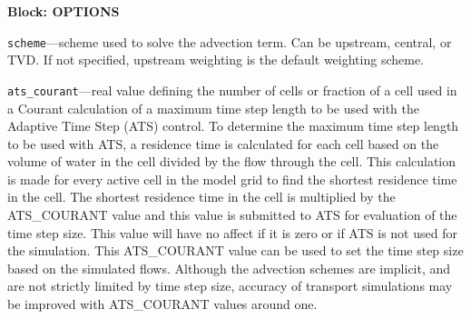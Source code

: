 
\item \textbf{Block: OPTIONS}

\begin{description}
\item \texttt{scheme}---scheme used to solve the advection term.  Can be upstream, central, or TVD.  If not specified, upstream weighting is the default weighting scheme.

\item \texttt{ats\_courant}---real value defining the number of cells or fraction of a cell used in a Courant calculation of a maximum time step length to be used with the Adaptive Time Step (ATS) control.  To determine the maximum time step length to be used with ATS, a residence time is calculated for each cell based on the volume of water in the cell divided by the flow through the cell.  This calculation is made for every active cell in the model grid to find the shortest residence time in the cell.  The shortest residence time in the cell is multiplied by the ATS\_COURANT value and this value is submitted to ATS for evaluation of the time step size.  This value will have no affect if it is zero or if ATS is not used for the simulation.  This ATS\_COURANT value can be used to set the time step size based on the simulated flows.  Although the advection schemes are implicit, and are not strictly limited by time step size, accuracy of transport simulations may be improved with ATS\_COURANT values around one.

\end{description}

